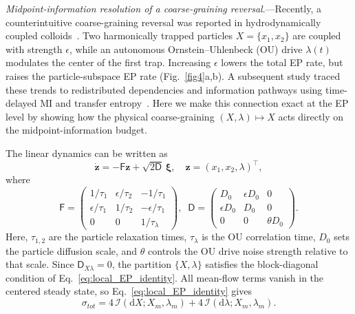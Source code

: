 \documentclass[
 longbibliography,
 twocolumn,
 superscriptaddress,
 amsmath,
 amssymb,
 amsthm,
 amsfonts,
 prl,
 floatfix,
]{revtex4-2}
\newcommand{\matbf}[1]{\boldsymbol{\mathsf{#1}}}
\begin{document}

\textit{Midpoint-information resolution of a coarse-graining reversal}.---Recently, a counterintuitive coarse-graining reversal was reported in hydrodynamically coupled colloids~\cite{das2025irreversibility}. Two harmonically trapped particles $X=\{x_1,x_2\}$ are coupled with strength $\epsilon$, while an autonomous Ornstein--Uhlenbeck (OU) drive $\lambda(t)$ modulates the center of the first trap. Increasing $\epsilon$ lowers the total EP rate, but raises the particle-subspace EP rate (Fig.~\ref{fig4}a,b). 
A subsequent study traced these trends to redistributed dependencies and information pathways using time-delayed MI and transfer entropy~\cite{das2025uraveling}.
Here we make this connection exact at the EP level by showing how the physical coarse-graining $(X,\lambda)\mapsto X$ acts directly on the midpoint-information budget.

The linear dynamics can be written as
\begin{equation}
    \dot{\bm z} = -\matbf F \bm z + \sqrt{2\matbf D}\,\bm\xi,
    \quad \bm z = (x_1,x_2,\lambda)^\intercal,
    \label{eq:Das_model}
\end{equation}
where
\begin{equation*}
    \matbf F\!=\!\!
    \begin{pmatrix}
    1/\tau_1 & \epsilon/{\tau_2} & -1/\tau_1 \\
    \epsilon/\tau_1 & 1/{\tau_2} & -\epsilon/\tau_1 \\
    0 & 0 & 1/\tau_\lambda
    \end{pmatrix}\!\!,
    \;\; 
    \matbf D\!=\!\!
    \begin{pmatrix}
    D_0 & \epsilon D_0 & 0 \\
    \epsilon D_0 & D_0 & 0 \\
    0 & 0 & \theta D_0
    \end{pmatrix}\!.   
    \label{eq:Das_model_details}
\end{equation*}
Here, $\tau_{1,2}$ are the particle relaxation times, $\tau_\lambda$ is the OU correlation time, $D_0$ sets the particle diffusion scale, and $\theta$ controls the OU drive noise strength relative to that scale.
Since $\matbf D_{X\lambda}=0$, the partition $\{X,\lambda\}$ satisfies the block-diagonal condition of Eq.~\eqref{eq:local_EP_identity}.
All mean-flow terms vanish in the centered steady state, so Eq.~\eqref{eq:local_EP_identity} gives
\begin{equation*}
    \sigma_{tot}=4\,\mathcal I(\mathrm dX;X_m,\lambda_m)+4\,\mathcal I(\mathrm d\lambda;X_m,\lambda_m).
    \label{eq:Das_model_local_EP_decom}
\end{equation*}
\end{document}
